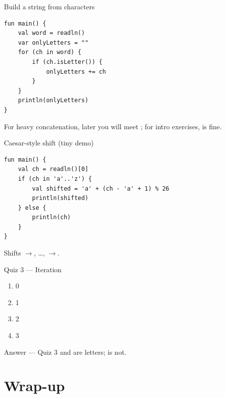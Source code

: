 \documentclass[aspectratio=169,11pt]{beamer}
\begin{document}
    \begin{frame}[fragile]{Build a string from characters}
        \begin{lstlisting}
fun main() {
    val word = readln()
    var onlyLetters = ""
    for (ch in word) {
        if (ch.isLetter()) {
            onlyLetters += ch
        }
    }
    println(onlyLetters)
}
        \end{lstlisting}
        \vspace{0.3em}
        For heavy concatenation, later you will meet ;
        for intro exercises, \kotlincode{+=} is fine.
    \end{frame}

    \begin{frame}[fragile]{Caesar-style shift (tiny demo)}
        \begin{lstlisting}
fun main() {
    val ch = readln()[0]
    if (ch in 'a'..'z') {
        val shifted = 'a' + (ch - 'a' + 1) % 26
        println(shifted)
    } else {
        println(ch)
    }
}
        \end{lstlisting}
        Shifts $\rightarrow$, \ldots,
        $\rightarrow$.
    \end{frame}

    \begin{frame}{Quiz 3 --- Iteration}
        \begin{enumerate}
            \item 0
            \item 1
            \item 2
            \item 3
        \end{enumerate}
        \quizpause
    \end{frame}

    \begin{frame}{Answer --- Quiz 3}
        \vspace{0.4em}
         and  are letters;  is not.
    \end{frame}

    \section{Wrap-up}
\end{document}
